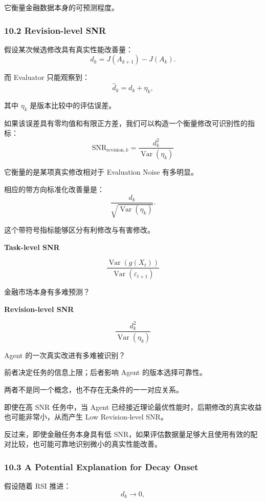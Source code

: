它衡量金融数据本身的可预测程度。

\hypertarget{part-4-60-0001-revision-level-snr}{%
\subsubsection{10.2 Revision-level SNR}\label{part-4-60-0001-revision-level-snr}}

假设某次候选修改具有真实性能改善量：
\[d_k=J(A_{k+1})-J(A_k).\]

而 Evaluator 只能观察到：
\[\widehat d_k=d_k+\eta_k,\]

其中 \(\eta_k\) 是版本比较中的评估误差。

如果该误差具有零均值和有限正方差，我们可以构造一个衡量修改可识别性的指标：
\[\boxed{
\mathrm{SNR}_{\mathrm{revision},k}
=
\frac{d_k^2}
{\operatorname{Var}(\eta_k)}
}\]

它衡量的是某项真实修改相对于 Evaluation Noise 有多明显。

相应的带方向标准化改善量是：
\[\frac{d_k}{\sqrt{\operatorname{Var}(\eta_k)}}.\]

这个带符号指标能够区分有利修改与有害修改。

\textbf{Task-level SNR}

\[\frac{\operatorname{Var}(g(X_t))}{\operatorname{Var}(\varepsilon_{t+1})}\]

金融市场本身有多难预测？

\textbf{Revision-level SNR}

\[\frac{d_k^2}{\operatorname{Var}(\eta_k)}\]

Agent 的一次真实改进有多难被识别？

前者决定任务的信息上限；后者影响 Agent 的版本选择可靠性。

两者不是同一个概念，也不存在无条件的一一对应关系。

即使在高 SNR 任务中，当 Agent 已经接近理论最优性能时，后期修改的真实收益也可能非常小，从而产生 Low Revision-level SNR。

反过来，即使金融任务本身具有低 SNR，如果评估数据量足够大且使用有效的配对比较，也可能可靠地识别微小的真实性能改善。

\hypertarget{part-4-60-0001-a-potential-explanation-for-decay-onset}{%
\subsubsection{10.3 A Potential Explanation for Decay Onset}\label{part-4-60-0001-a-potential-explanation-for-decay-onset}}

假设随着 RSI 推进：
\[d_k\longrightarrow0,\]

